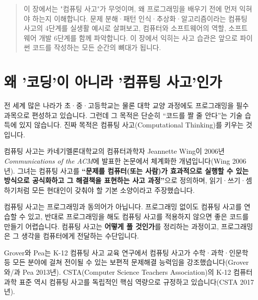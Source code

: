 \documentclass[
  korean,
  11pt,
  a4paper,
  DIV=11,
  numbers=noendperiod]{scrreprt}
\begin{document}
\begin{quote}
이 장에서는 "컴퓨팅 사고"가 무엇이며, 왜 프로그래밍을 배우기 전에 먼저
익혀야 하는지 이해합니다. 문제 분해·패턴 인식·추상화·알고리즘이라는
{컴퓨팅 사고의 4단계}를 실생활 예시로 살펴보고, 컴퓨터와 소프트웨어의
역할, 소프트웨어 개발 6단계를 함께 파악합니다. 이 장에서 익히는 사고
습관은 앞으로 파이썬 코드를 작성하는 모든 순간의 뼈대가 됩니다.
\end{quote}

\section{왜 '코딩'이 아니라 '컴퓨팅 사고'인가}\label{sec-why-ct}

전 세계 많은 나라가 초·중·고등학교는 물론 대학 교양 과정에도
프로그래밍을 필수 과목으로 편성하고 있습니다. 그런데 그 목적은 단순히
``코드를 짤 줄 안다''는 기술 습득에 있지 않습니다. 진짜 목적은 {컴퓨팅
사고(Computational Thinking)}를 키우는 것입니다.

컴퓨팅 사고는 카네기멜론대학교의 컴퓨터과학자 Jeannette Wing이 2006년
\emph{Communications of the ACM}에 발표한 논문에서 체계화한
개념입니다(Wing 2006년). 그녀는 컴퓨팅 사고를 \textbf{``문제를
컴퓨터(또는 사람)가 효과적으로 실행할 수 있는 방식으로 공식화하고 그
해결책을 표현하는 사고 과정''}으로 정의하며, 읽기·쓰기·셈하기처럼 모든
현대인이 갖춰야 할 기본 소양이라고 주장했습니다.

\begin{tcolorbox}[enhanced jigsaw, arc=.35mm, bottomrule=.15mm, bottomtitle=1mm, breakable, colback=white, colbacktitle=quarto-callout-note-color!10!white, colframe=quarto-callout-note-color-frame, coltitle=black, left=2mm, leftrule=.75mm, opacityback=0, opacitybacktitle=0.6, rightrule=.15mm, title=\textcolor{quarto-callout-note-color}{\faInfo}\hspace{0.5em}{컴퓨팅 사고 ≠ 프로그래밍}, titlerule=0mm, toprule=.15mm, toptitle=1mm]

컴퓨팅 사고는 프로그래밍과 동의어가 아닙니다. 프로그래밍 없이도 컴퓨팅
사고를 연습할 수 있고, 반대로 프로그래밍을 해도 컴퓨팅 사고를 적용하지
않으면 좋은 코드를 만들기 어렵습니다. 컴퓨팅 사고는 \textbf{어떻게 풀
것인가}를 정리하는 과정이고, 프로그래밍은 그 생각을 컴퓨터에게 전달하는
수단입니다.

\end{tcolorbox}

Grover와 Pea는 K-12 컴퓨팅 사고 교육 연구에서 컴퓨팅 사고가
수학·과학·인문학 등 모든 분야에 걸쳐 전이될 수 있는 보편적 문제해결
능력임을 강조했습니다(Grover 와/과 Pea 2013년). CSTA(Computer Science
Teachers Association)의 K-12 컴퓨터과학 표준 역시 컴퓨팅 사고를 독립적인
핵심 역량으로 규정하고 있습니다(CSTA 2017년).
\end{document}
